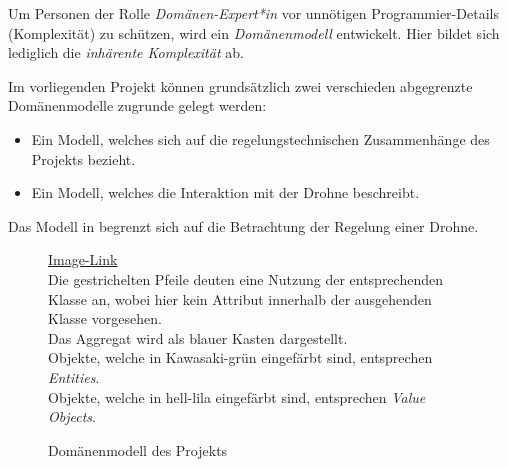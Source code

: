 
Um Personen der  Rolle \textit{Domänen-Expert*in} vor unnötigen Programmier-Details (Komplexität) zu schützen, wird ein \textit{Domänenmodell} entwickelt. Hier bildet sich lediglich die \textit{inhärente Komplexität} ab.

Im vorliegenden Projekt können grundsätzlich zwei verschieden abgegrenzte Domänenmodelle zugrunde gelegt werden:
\begin{itemize}
\item Ein Modell, welches sich auf die regelungstechnischen Zusammenhänge des Projekts bezieht.
\item Ein Modell, welches die Interaktion mit der Drohne beschreibt.
\end{itemize}

Das Modell in  begrenzt sich auf die Betrachtung der Regelung einer Drohne. 

\begin{figure}[ht!]
\vspace{0.25cm}
\begin{center}
\caption{Domänenmodell des Projekts}
\label{fig:DomainMod}
\end{center}

\vspace{0.25cm}
\href{https://github.com/MaagMich/SWE2\_Project/blob/c5c3674bd201ee306463881cf711bb2ce9229842/Ausarbeitung/Pictures/Domain\%20Modell.png}{Image-Link}\\
Die gestrichelten Pfeile deuten eine Nutzung der entsprechenden Klasse an, wobei hier kein Attribut innerhalb der ausgehenden Klasse vorgesehen.\\
Das Aggregat wird als blauer Kasten dargestellt.\\
Objekte, welche in Kawasaki-grün eingefärbt sind, entsprechen \textit{Entities}.\\
Objekte, welche in hell-lila eingefärbt sind, entsprechen \textit{Value Objects}.
\end{figure}






